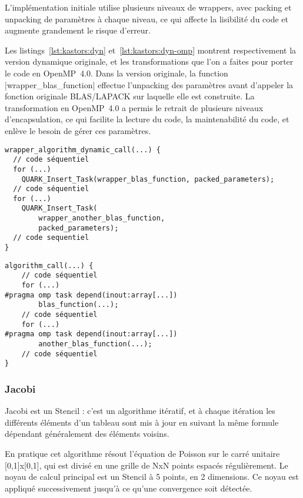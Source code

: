 L'implémentation initiale utilise plusieurs niveaux de wrappers, avec packing et unpacking de paramètres à chaque niveau, ce qui affecte la lisibilité du code et augmente grandement le risque d'erreur.

Les listings~\ref{lst:kastors:dyn} et~\ref{lst:kastors:dyn-omp} montrent respectivement la version dynamique originale, et les transformations que l'on a faites pour porter le code en OpenMP~4.0.
Dans la version originale, la function |wrapper_blas_function| effectue l'unpacking des paramètres avant d'appeler la fonction originale BLAS/LAPACK sur laquelle elle est construite.
La transformation en OpenMP~4.0 a permis le retrait de plusieurs niveaux d'encapsulation, ce qui facilite la lecture du code, la maintenabilité du code, et enlève le besoin de gérer ces paramètres.

\begin{lstlisting}[caption=Format de l'algorithme dynamique,label=lst:kastors:dyn]
wrapper_algorithm_dynamic_call(...) {
  // code séquentiel
  for (...)
    QUARK_Insert_Task(wrapper_blas_function, packed_parameters);
  // code séquentiel
  for (...)
    QUARK_Insert_Task(
        wrapper_another_blas_function,
        packed_parameters);
  // code sequentiel
}
\end{lstlisting}
\begin{lstlisting}[caption=Format de l'algorithme OpenMP,label=lst:kastors:dyn-omp]
algorithm_call(...) {
    // code séquentiel
    for (...)
#pragma omp task depend(inout:array[...])
        blas_function(...);
    // code séquentiel
    for (...)
#pragma omp task depend(inout:array[...])
        another_blas_function(...);
    // code séquentiel
}
\end{lstlisting}


\subsubsection{Jacobi}

Jacobi est un Stencil : c'est un algorithme itératif, et à chaque itération les différents éléments d'un tableau sont mis à jour en suivant la même formule dépendant généralement des éléments voisins.

En pratique cet algorithme résout l'équation de Poisson sur le carré unitaire [0,1]x[0,1], qui est divisé en une grille de NxN points espacés régulièrement.
Le noyau de calcul principal est un Stencil à 5 points, en 2 dimensions.
Ce noyau est appliqué successivement jusqu'à ce qu'une convergence soit détectée.

